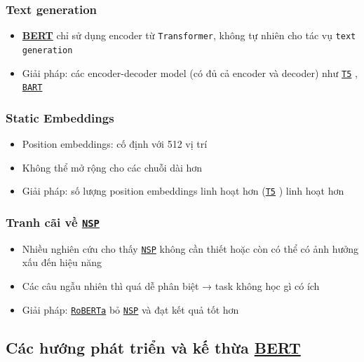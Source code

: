 \subsubsection{Text generation}
\begin{itemize}
    \item \hyperref[acro:bert]{\textbf{BERT}} chỉ sử dụng encoder từ \texttt{Transformer}, không tự nhiên cho tác vụ \texttt{text generation}
    \item Giải pháp: các encoder-decoder model (có đủ cả encoder và decoder) như \hyperref[acro:t5]{\texttt{T5}} \cite{raffel2020exploring}, \hyperref[acro:bart]{\texttt{BART}} \cite{lewis2019bart}
\end{itemize}

\subsubsection{Static Embeddings}
\begin{itemize}
    \item Position embeddings: cố định với 512 vị trí
    \item Không thể mở rộng cho các chuỗi dài hơn
    \item Giải pháp: số lượng position embeddings linh hoạt hơn (\hyperref[acro:t5]{\texttt{T5}} \cite{raffel2020exploring}) linh hoạt hơn
\end{itemize}

\subsubsection{Tranh cãi về \hyperref[acro:nsp]{\texttt{NSP}}}
\begin{itemize}
    \item Nhiều nghiên cứu cho thấy \hyperref[acro:nsp]{\texttt{NSP}} không cần thiết hoặc còn có thể có ảnh hưởng xấu đến hiệu năng \cite{liu2019roberta}
    \item Các câu ngẫu nhiên thì quá dễ phân biệt → task không học gì có ích
    \item Giải pháp: \hyperref[acro:roberta]{\texttt{RoBERTa}} \cite{liu2019roberta} bỏ \hyperref[acro:nsp]{\texttt{NSP}} và đạt kết quả tốt hơn
\end{itemize}

\subsection{Các hướng phát triển và kế thừa \hyperref[acro:bert]{\textbf{BERT}}}
\label{ssec:huong_phat_trien_ke_thua}

